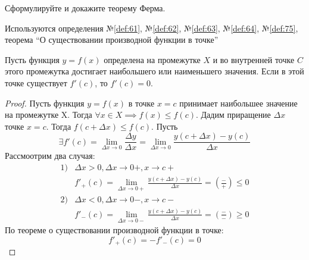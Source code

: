 \begin{question}
    Сформулируйте и докажите теорему Ферма.
\end{question}
\begin{used}
    Используются определения №\ref{def:61}, №\ref{def:62}, №\ref{def:63}, №\ref{def:64}, №\ref{def:75}, теорема ``О существовании производной функции в точке''
\end{used}
\begin{theorem}
    Пусть функция $y = f(x)$ определена на промежутке $X$ и во внутренней точке $C$ этого промежутка достигает наибольшего или наименьшего значения. Если в этой точке существует $f'(c)$, то $f'(c) = 0$.
\end{theorem}
\begin{proof}
    Пусть функция $y = f(x)$ в точке  $x = c$ принимает наибольшее значение на промежутке X. Тогда $\forall x \in X \implies f(x) \le f(c)$. Дадим приращение $\Delta x$ точке $x = c$. Тогда $f(c + \Delta x) \le f(c)$. Пусть \[
        \exists f'(c) = \lim_{\Delta x \to 0} \frac{\Delta y}{\Delta x} = \lim_{\Delta x \to 0} \frac{y(c + \Delta x) - y(c)}{\Delta x}
    \]
    Рассмоотрим два случая:
    \begin{align*}
        1) &\Delta x > 0, \Delta x \to 0+, x \to c+ \\
        &f'_+(c) = \lim_{\Delta x \to 0+} \frac{y(c + \Delta x) - y(c)}{\Delta x} = \left( \frac{-}{+} \right) \le 0 \\
        2) &\Delta x < 0, \Delta x \to 0-, x \to c- \\
        &f'_-(c) = \lim_{\Delta x \to 0-} \frac{y(c + \Delta x) - y(c)}{\Delta x} = \left( \frac{-}{-} \right) \ge 0
    \end{align*}
    По теореме о существовании производной функции в точке: \[
        f'_+(c) = -f'_-(c) = 0
    \] 
\end{proof}
\pagebreak



